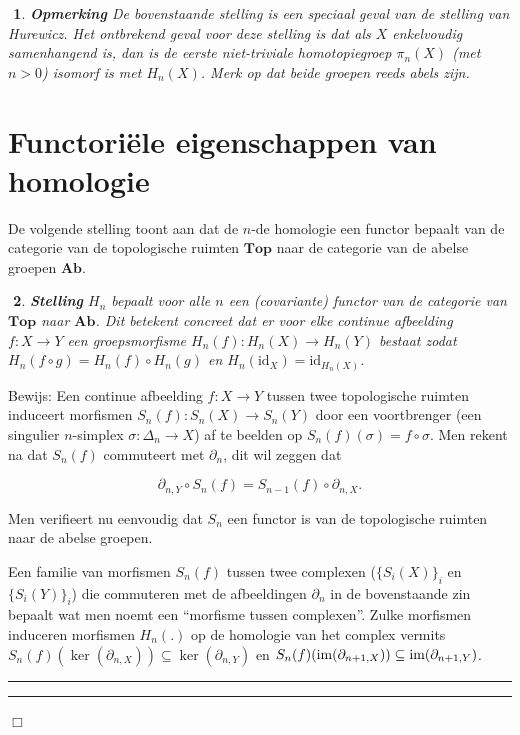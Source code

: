 \documentclass[12pt]{book}
\newcommand{\bew}{{\sc Bewijs: }}
\newcommand{\B}{\rule{1mm}{0mm} \hfill $\Box$ }
\newcommand{\id}{\mbox{id}}
\newtheorem{stelh}{$\!\!$}[section]
\newenvironment{stel}{\begin{stelh}{\em {\bf Stelling }}}{\end{stelh}}
\newtheorem{opmh}[stelh]{$\!\!$}
\newenvironment{eopm}{\begin{opmh} \em {\bf Opmerking }}{\end{opmh}}
\begin{document}
\begin{eopm}
De bovenstaande stelling is een speciaal geval van de stelling van Hurewicz. Het ontbrekend geval voor deze stelling is dat als $X$  enkelvoudig samenhangend is, dan is de eerste niet-triviale homotopiegroep $\pi_n(X)$ (met $n>0$) isomorf is met $H_n(X)$. Merk op dat beide groepen reeds abels zijn.
\end{eopm}

\section{Functori\"{e}le eigenschappen van  homologie}

De volgende stelling toont aan dat de $n$-de homologie een functor bepaalt van de categorie van de topologische ruimten $\mathbf{Top}$ naar de categorie van de abelse groepen $\mathbf{Ab}$. %

\begin{stel}
$H_n$ bepaalt voor alle $n$ een (covariante) functor van de categorie van $\mathbf{Top}$ naar $\mathbf{Ab}$. Dit betekent concreet dat er voor elke continue afbeelding $f:X\to Y$ een groepsmorfisme
$H_{n}(f):H_{n}(X)\to H_{n}(Y)$ bestaat zodat $H_{n}(f\circ g)=H_{n}(f)\circ H_{n}(g)$ en $H_{n}(\id_{X})={\id}_{H_{n}(X)}$.
\end{stel}

\bew Een continue afbeelding $f:X\to Y$ tussen twee topologische ruimten induceert 
morfismen $S_{n}(f):S_{n}(X)\to S_{n}(Y)$ door een voortbrenger (een  singulier
$n$-simplex $\sigma:\Delta_{n}\to X$) af te beelden op $S_{n}(f)(\sigma)=f\circ \sigma$.
Men rekent na dat $S_{n}(f)$ commuteert met $\partial_{n}$, dit wil zeggen dat

$$\partial_{n,Y}\circ S_{n}(f)=S_{n-1}(f)\circ \partial_{n,X}.$$ 



Men verifieert nu eenvoudig dat $S_n$ een functor is van de topologische ruimten naar de abelse groepen.

Een familie van morfismen $S_{n}(f)$ tussen twee complexen ($\{S_{i}(X)\}_{i}$ en
$\{S_{i}(Y)\}_{i}$) die commuteren met de afbeeldingen $\partial_{n}$ in de bovenstaande zin
bepaalt wat men noemt een  ``morfisme tussen  complexen''. Zulke morfismen induceren morfismen $H_n(.)$
op de homologie van het complex vermits $S_{n}(f)(\ker (\partial_{n,X}))\subseteq \ker
(\partial_{n,Y})$ en $S_{n}(f)(\mbox{{\rm im}}(\partial_{n+1,X}))\subseteq \mbox{{\rm im}}
(\partial_{n+1,Y})$.
\rule{1mm}{0mm} \hfill \B \\
\end{document}
